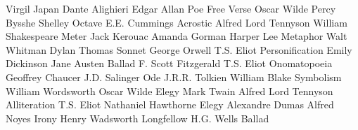 \answerkey
{} Virgil
 Japan
 Dante Alighieri
 Edgar Allan Poe
 Free Verse
 Oscar Wilde
 Percy Bysshe Shelley
 Octave
 E.E. Cummings
 Acrostic
 Alfred Lord Tennyson
 William Shakespeare
 Meter
 Jack Kerouac
 Amanda Gorman
 Harper Lee
 Metaphor
 Walt Whitman
 Dylan Thomas
 Sonnet
 George Orwell
 T.S. Eliot
 Personification
 Emily Dickinson
 Jane Austen
 Ballad
 F. Scott Fitzgerald
 T.S. Eliot
 Onomatopoeia
 Geoffrey Chaucer
 J.D. Salinger
 Ode
 J.R.R. Tolkien
 William Blake
 Symbolism
 William Wordsworth
 Oscar Wilde
 Elegy
 Mark Twain
 Alfred Lord Tennyson
 Alliteration
 T.S. Eliot
 Nathaniel Hawthorne
 Elegy
 Alexandre Dumas
 Alfred Noyes
 Irony
 Henry Wadsworth Longfellow
 H.G. Wells
 Ballad
\endanswerkey